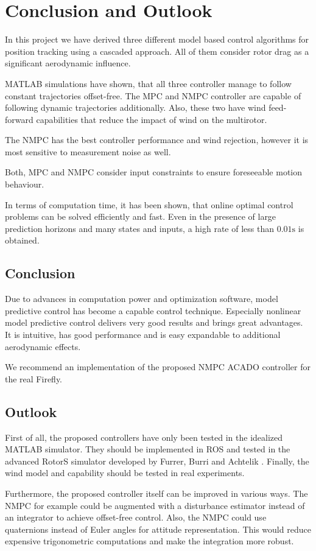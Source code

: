 \chapter{Conclusion and Outlook}
\label{sec:result}
In this project we have derived three different model based control algorithms for position tracking using a cascaded approach. All of them consider rotor drag as a significant aerodynamic influence. 

MATLAB simulations have shown, that all three controller manage to follow constant trajectories offset-free. The MPC and NMPC controller are  capable of following dynamic trajectories additionally. Also, these two have wind feed-forward capabilities that reduce the impact of wind on the multirotor.

The NMPC has the best controller performance and wind rejection, however it is most sensitive to measurement noise as well. 

Both, MPC and NMPC consider input constraints to ensure foreseeable motion behaviour.

In terms of computation time, it has been shown, that online optimal control problems can be solved efficiently and fast. Even in the presence of large prediction horizons and many states and inputs, a high rate of less than $0.01 \si{\second}$ is obtained. 

\section*{Conclusion}
Due to advances in computation power and optimization software, model predictive control has become a capable control technique. Especially nonlinear model predictive control delivers very good results and brings great advantages. It is intuitive, has good performance and is easy expandable to additional aerodynamic effects.

We recommend an implementation of the proposed NMPC ACADO controller for the real Firefly.

\section*{Outlook}
First of all, the proposed controllers have only been tested in the idealized MATLAB simulator. They should be implemented in ROS and tested in the advanced RotorS simulator developed by Furrer, Burri and Achtelik \cite{www:rotors}. Finally, the wind model and capability should be tested in real experiments.

Furthermore, the proposed controller itself can be improved in various ways. The NMPC for example could be augmented with a disturbance estimator instead of an integrator to achieve offset-free control. Also, the NMPC could use quaternions instead of Euler angles for attitude representation. This would reduce expensive trigonometric computations and make the integration more robust.


